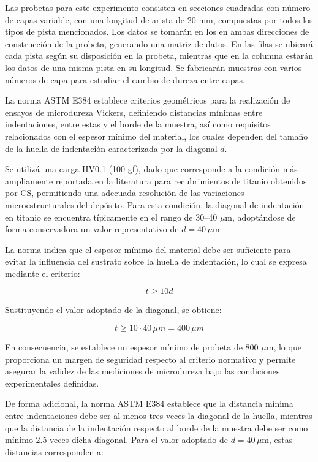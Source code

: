 Las probetas para este experimento consisten en secciones cuadradas con número de capas variable, con una longitud de arista de 20 mm, compuestas por todos los tipos de pista mencionados. Los datos se tomarán en los en ambas direcciones de construcción de la probeta, generando una matriz de datos. En las filas se ubicará cada pista según su disposición en la probeta, mientras que en la columna estarán los datos de una misma pista en su longitud. Se fabricarán muestras con varios números de capa para estudiar el cambio de dureza entre capas.

La norma ASTM E384 establece criterios geométricos para la realización de ensayos de microdureza Vickers, definiendo distancias mínimas entre indentaciones, entre estas y el borde de la muestra, así como requisitos relacionados con el espesor mínimo del material, los cuales dependen del tamaño de la huella de indentación caracterizada por la diagonal $d$.

Se utilizá una carga HV0.1 (100 gf), dado que corresponde a la condición más ampliamente reportada en la literatura para recubrimientos de titanio obtenidos por CS, permitiendo una adecuada resolución de las variaciones microestructurales del depósito. Para esta condición, la diagonal de indentación en titanio se encuentra típicamente en el rango de 30--40 $\mu$m, adoptándose de forma conservadora un valor representativo de $d = 40 \, \mu$m.

La norma indica que el espesor mínimo del material debe ser suficiente para evitar la influencia del sustrato sobre la huella de indentación, lo cual se expresa mediante el criterio:

\begin{equation}
	t \geq 10d
\end{equation}

Sustituyendo el valor adoptado de la diagonal, se obtiene:

\begin{equation}
	t \geq 10 \cdot 40 \, \mu m = 400 \, \mu m
\end{equation}

En consecuencia, se establece un espesor mínimo de probeta de 800 $\mu$m, lo que proporciona un margen de seguridad respecto al criterio normativo y permite asegurar la validez de las mediciones de microdureza bajo las condiciones experimentales definidas.

De forma adicional, la norma ASTM E384 establece que la distancia mínima entre indentaciones debe ser al menos tres veces la diagonal de la huella, mientras que la distancia de la indentación respecto al borde de la muestra debe ser como mínimo 2.5 veces dicha diagonal. Para el valor adoptado de $d = 40 \, \mu$m, estas distancias corresponden a:

